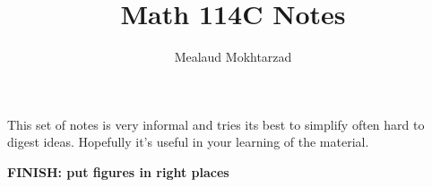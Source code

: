 \documentclass{article}
\title{Math 114C Notes}
\author{Mealaud Mokhtarzad}
\date{}
\begin{document}
\maketitle

This set of notes is very informal and tries its best to simplify often hard to digest ideas. Hopefully it's useful in your learning of the material.

\textbf{FINISH: put figures in right places}

\newpage

\renewcommand{\headrulewidth}{0pt}
\tableofcontents
\newpage

\renewcommand{\headrulewidth}{0.4pt}


\newpage

\newpage

\end{document}
